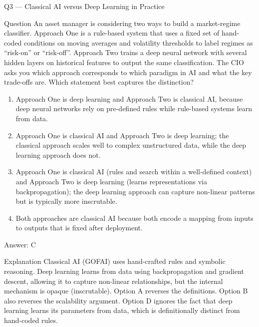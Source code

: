 \documentclass[aspectratio=169,8pt]{beamer}
\begin{document}
	\begin{frame}{Q3 --- Classical AI versus Deep Learning in Practice}
		\begin{block}{Question}
			An asset manager is considering two ways to build a market-regime classifier. Approach One is a rule-based system that uses a fixed set of hand-coded conditions on moving averages and volatility thresholds to label regimes as ``risk-on'' or ``risk-off''. Approach Two trains a deep neural network with several hidden layers on historical features to output the same classification. The CIO asks you which approach corresponds to which paradigm in AI and what the key trade-offs are. Which statement best captures the distinction?
		\end{block}
		\begin{enumerate}
			\item Approach One is deep learning and Approach Two is classical AI, because deep neural networks rely on pre-defined rules while rule-based systems learn from data.
			\item Approach One is classical AI and Approach Two is deep learning; the classical approach scales well to complex unstructured data, while the deep learning approach does not.
			\item Approach One is classical AI (rules and search within a well-defined context) and Approach Two is deep learning (learns representations via backpropagation); the deep learning approach can capture non-linear patterns but is typically more inscrutable.
			\item Both approaches are classical AI because both encode a mapping from inputs to outputs that is fixed after deployment.
		\end{enumerate}
		\begin{exampleblock}{Answer: C}\end{exampleblock}
		\begin{block}{Explanation}
			Classical AI (GOFAI) uses hand-crafted rules and symbolic reasoning. Deep learning learns from data using backpropagation and gradient descent, allowing it to capture non-linear relationships, but the internal mechanism is opaque (inscrutable). Option A reverses the definitions. Option B also reverses the scalability argument. Option D ignores the fact that deep learning learns its parameters from data, which is definitionally distinct from hand-coded rules.
		\end{block}
	\end{frame}
	
\end{document}
